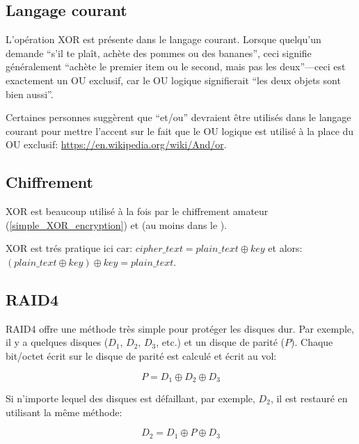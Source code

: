 ﻿
\label{XOR_property}



\subsection{Langage courant}

L'opération XOR est présente dans le langage courant.
Lorsque quelqu'un demande ``s'il te plaît, achète des pommes ou des bananes'', ceci
signifie généralement ``achète le premier item ou le second, mais pas les deux''---ceci
est exactement un OU exclusif, car le OU logique signifierait ``les deux objets sont bien aussi''.

Certaines personnes suggèrent que ``et/ou'' devraient être utilisés dans le langage
courant pour mettre l'accent sur le fait que le OU logique est utilisé à la place
du OU exclusif: \url{https://en.wikipedia.org/wiki/And/or}.

\subsection{Chiffrement}

XOR est beaucoup utilisé à la fois par le chiffrement amateur (\ref{simple_XOR_encryption})
et  (au moins dans le ).

XOR est trés pratique ici car:
$cipher\_text = plain\_text \oplus key$ et alors:
$(plain\_text \oplus key) \oplus key = plain\_text$.

\subsection{\ac{RAID}4}

\ac{RAID}4 offre une méthode très simple pour protéger les disques dur.
Par exemple, il y a quelques disques ($D_1$, $D_2$, $D_3$, etc.) et un disque de
parité ($P$).
Chaque bit/octet écrit sur le disque de parité est calculé et écrit au vol:

\begin{equation} \label{eq:RAID4}
P = D_1 \oplus D_2 \oplus D_3
\end{equation}

Si n'importe lequel des disques est défaillant, par exemple, $D_2$, il est restauré
en utilisant la même méthode:

\begin{equation}
D_2 = D_1 \oplus P \oplus D_3
\end{equation}

